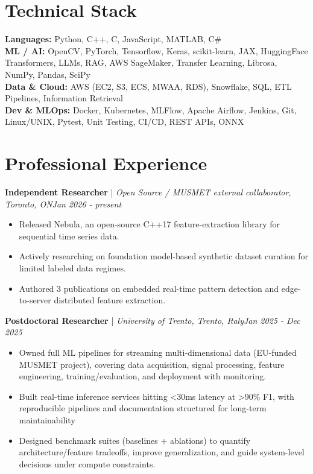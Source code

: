 \documentclass[11pt]{article}
\newenvironment{cvrole}[5]{%
  \par\noindent\textbf{\large #1} | \textit{\small #2, #3}\hfill \textit{\small #4 - #5}\par
  \begin{itemize}[leftmargin=2em, itemsep=-0.3em, topsep=-0.5em]%
}{%
  \end{itemize}\par\noindent\mbox{}\par\vspace{0.1em}%
}
\begin{document}
\section*{Technical Stack}
\textbf{Languages:} Python, C++, C, JavaScript, MATLAB, C\#\\
\textbf{ML / AI:} OpenCV, PyTorch, Tensorflow, Keras, scikit-learn, JAX, HuggingFace Transformers, LLMs, RAG, AWS SageMaker, Transfer Learning, Librosa, NumPy, Pandas, SciPy\\
\textbf{Data \& Cloud:} AWS (EC2, S3, ECS, MWAA, RDS), Snowflake, SQL, ETL Pipelines, Information Retrieval\\
\textbf{Dev \& MLOps:} Docker, Kubernetes, MLFlow, Apache Airflow, Jenkins, Git, Linux/UNIX, Pytest, Unit Testing, CI/CD, REST APIs, ONNX

\section*{Professional Experience}
\begin{cvrole}{Independent Researcher}{Open Source / MUSMET external collaborator}{Toronto, ON}{Jan 2026}{present}
    \item Released Nebula, an open-source C++17 feature-extraction library for sequential time series data.
    \item Actively researching on foundation model-based synthetic dataset curation for limited labeled data regimes.
    \item Authored 3 publications on embedded real-time pattern detection and edge-to-server distributed feature extraction.
\end{cvrole}

\begin{cvrole}{Postdoctoral Researcher}{University of Trento}{Trento, Italy}{Jan 2025}{Dec 2025}
    \item Owned full ML pipelines for streaming multi-dimensional data (EU-funded MUSMET project), covering data acquisition, signal processing, feature engineering, training/evaluation, and deployment with monitoring.
    \item Built real-time inference services hitting <30ms latency at >90\% F1, with reproducible pipelines and documentation structured for long-term maintainability
    \item Designed benchmark suites (baselines + ablations) to quantify architecture/feature tradeoffs, improve generalization, and guide system-level decisions under compute constraints.
\end{cvrole}
\end{document}

